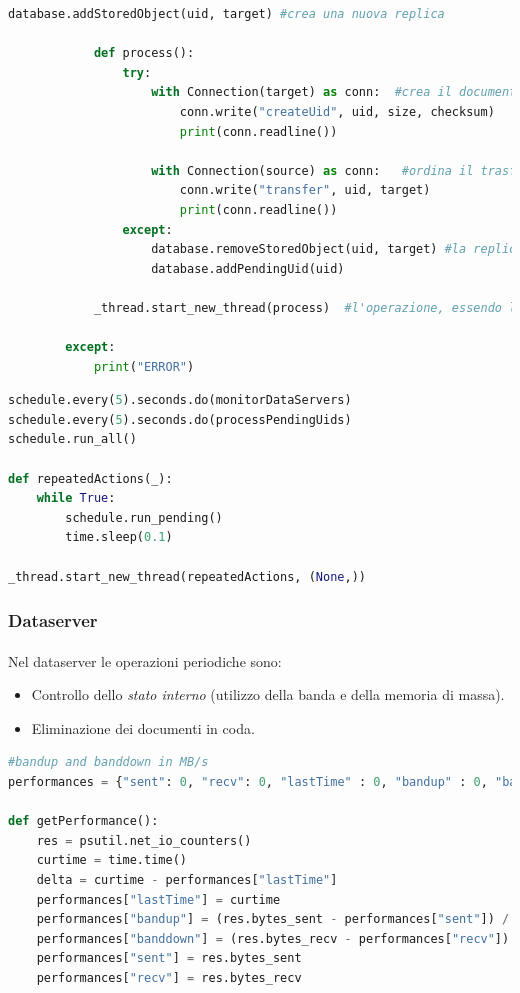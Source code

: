 \documentclass[11pt,a4paper,english]{article}
\begin{document}
\begin{lstlisting}[language=Python, title=Mantenimento del grado di replicazione dei documenti]
            database.addStoredObject(uid, target) #crea una nuova replica

            def process():
                try:
                    with Connection(target) as conn:  #crea il documento sul server di destinazione
                        conn.write("createUid", uid, size, checksum)
                        print(conn.readline())

                    with Connection(source) as conn:   #ordina il trasferimento
                        conn.write("transfer", uid, target)
                        print(conn.readline())
                except:
                    database.removeStoredObject(uid, target) #la replica non e' stata creata con successo
                    database.addPendingUid(uid)

            _thread.start_new_thread(process)  #l'operazione, essendo lunga, viene eseguita su un thread separato

        except:
            print("ERROR")
\end{lstlisting}

\begin{lstlisting}[language=Python, title=Scheduling ed esecuzione]
schedule.every(5).seconds.do(monitorDataServers)
schedule.every(5).seconds.do(processPendingUids)
schedule.run_all()

def repeatedActions(_):
    while True:
        schedule.run_pending()
        time.sleep(0.1)

_thread.start_new_thread(repeatedActions, (None,))
\end{lstlisting}


\subsubsection{Dataserver}

\paragraph{} Nel dataserver le operazioni periodiche sono:\begin{itemize}
	\item Controllo dello \emph{stato interno} (utilizzo della banda e della memoria di massa).
	\item Eliminazione dei documenti in coda.
\end{itemize}


\begin{lstlisting}[language=Python, title=Controllo dello stato interno]
#bandup and banddown in MB/s
performances = {"sent": 0, "recv": 0, "lastTime" : 0, "bandup" : 0, "banddown" : 0}

def getPerformance():
    res = psutil.net_io_counters()
    curtime = time.time()
    delta = curtime - performances["lastTime"]
    performances["lastTime"] = curtime
    performances["bandup"] = (res.bytes_sent - performances["sent"]) / delta / 1000000
    performances["banddown"] = (res.bytes_recv - performances["recv"]) / delta / 1000000
    performances["sent"] = res.bytes_sent
    performances["recv"] = res.bytes_recv
\end{lstlisting}
\end{document}

